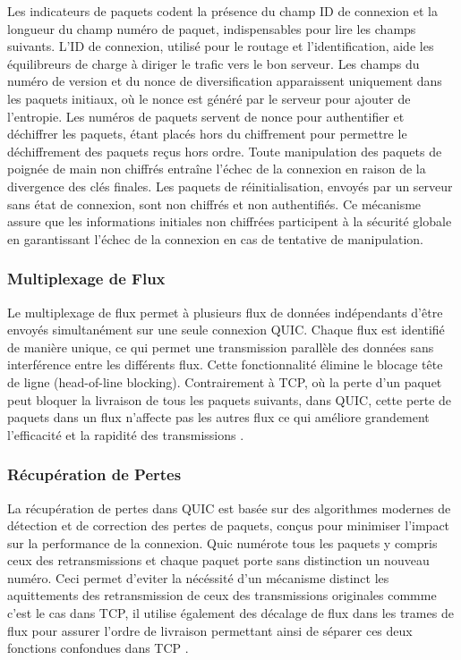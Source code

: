 Les indicateurs de paquets codent la présence du champ ID de connexion et la longueur du champ numéro de paquet, indispensables pour lire les champs suivants. L'ID de connexion, utilisé pour le routage et l'identification, aide les équilibreurs de charge à diriger le trafic vers le bon serveur. Les champs du numéro de version et du nonce de diversification apparaissent uniquement dans les paquets initiaux, où le nonce est généré par le serveur pour ajouter de l'entropie. Les numéros de paquets servent de nonce pour authentifier et déchiffrer les paquets, étant placés hors du chiffrement pour permettre le déchiffrement des paquets reçus hors ordre. Toute manipulation des paquets de poignée de main non chiffrés entraîne l'échec de la connexion en raison de la divergence des clés finales. Les paquets de réinitialisation, envoyés par un serveur sans état de connexion, sont non chiffrés et non authentifiés. Ce mécanisme assure que les informations initiales non chiffrées participent à la sécurité globale en garantissant l'échec de la connexion en cas de tentative de manipulation.

\subsubsection{Multiplexage de Flux}
Le multiplexage de flux permet à plusieurs flux de données indépendants d'être envoyés simultanément sur une seule connexion QUIC. Chaque flux est identifié de manière unique, ce qui permet une transmission parallèle des données sans interférence entre les différents flux. Cette fonctionnalité élimine le blocage tête de ligne (head-of-line blocking). Contrairement à TCP, où la perte d'un paquet peut bloquer la livraison de tous les paquets suivants, dans QUIC, cette perte de paquets dans un flux n'affecte pas les autres flux ce qui améliore grandement l'efficacité et la rapidité des transmissions \cite{langley2017quic}.  

\subsubsection{Récupération de Pertes}
La récupération de pertes dans QUIC est basée sur des algorithmes modernes de détection et de correction des pertes de paquets, conçus pour minimiser l'impact sur la performance de la connexion. Quic numérote tous les paquets y compris ceux des retransmissions et chaque paquet porte sans distinction un nouveau numéro. Ceci permet d'eviter la nécéssité d'un mécanisme distinct les aquittements des retransmission de ceux des transmissions originales commme c'est le cas dans TCP, il utilise également des décalage de flux dans les trames de flux pour assurer l'ordre de livraison permettant ainsi de séparer ces deux fonctions confondues dans TCP \cite{langley2017quic, alawaji2021ietf}.

